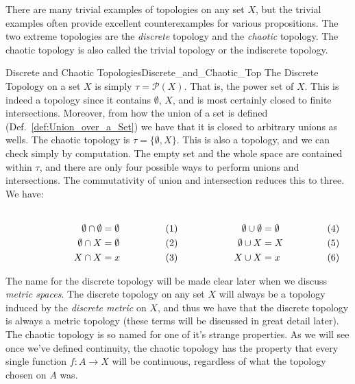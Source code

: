     There are many trivial examples of topologies on any set $X$, but the
    trivial examples often provide excellent counterexamples for various
    propositions. The two extreme topologies are the \textit{discrete} topology
    and the \textit{chaotic} topology. The chaotic topology is also called the
    trivial topology or the indiscrete topology.
    \begin{fexample}{Discrete and Chaotic Topologies}{Discrete_and_Chaotic_Top}
        The Discrete Topology on a set $X$ is simply
        $\tau=\mathcal{P}(X)$. That is, the \gls{power set} of $X$. This is
        indeed a topology since it contains $\emptyset$, $X$, and is most
        certainly closed to finite intersections. Moreover, from how the union
        of a set is defined (Def.~\ref{def:Union_over_a_Set}) we have that it
        is closed to arbitrary unions as wells. The chaotic topology%
         is $\tau=\{\emptyset,X\}$. This is also a
        topology, and we can check simply by computation. The empty set
        and the whole space are contained within $\tau$, and there are only four
        possible ways to perform unions and intersections. The commutativity of
        union and intersection reduces this to three. We have:
        \par
        \begin{subequations}
            \begin{minipage}[b]{0.49\textwidth}
                \begin{align}
                    \emptyset\cap\emptyset&=\emptyset\\
                    \emptyset\cap{X}&=\emptyset\\
                    X\cap{X}&=x
                \end{align}
            \end{minipage}
            \hfill
            \begin{minipage}[b]{0.49\textwidth}
                \begin{align}
                    \emptyset\cup\emptyset&=\emptyset\\
                    \emptyset\cup{X}&=X\\
                    X\cup{X}&=x
                \end{align}
            \end{minipage}
        \end{subequations}
        \par\vspace{2.5ex}
        The name for the discrete topology will be made clear later when we
        discuss \textit{metric spaces}. The discrete topology on any set $X$
        will always be a topology induced by the \textit{discrete metric} on
        $X$, and thus we have that the discrete topology is always a metric
        topology (these terms will be discussed in great detail later). The
        chaotic topology is so named for one of it's strange properties. As we
        will see once we've defined continuity, the chaotic topology has the
        property that every single function $f:A\rightarrow{X}$ will be
        continuous, regardless of what the topology chosen on $A$ was.
    \end{fexample}
